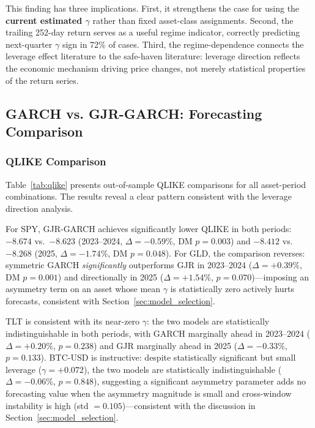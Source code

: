 This finding has three implications. First, it strengthens the case for using the \textbf{current estimated $\gamma$} rather than fixed asset-class assignments. Second, the trailing 252-day return serves as a useful regime indicator, correctly predicting next-quarter $\gamma$ sign in 72\% of cases. Third, the regime-dependence connects the leverage effect literature to the safe-haven literature: leverage direction reflects the economic mechanism driving price changes, not merely statistical properties of the return series.


\subsection{GARCH vs. GJR-GARCH: Forecasting Comparison}
\label{sec:garch_comparison}

\subsubsection{QLIKE Comparison}

Table~\ref{tab:qlike} presents out-of-sample QLIKE comparisons for all asset-period combinations. The results reveal a clear pattern consistent with the leverage direction analysis.

For SPY, GJR-GARCH achieves significantly lower QLIKE in both periods: $-8.674$ vs.\ $-8.623$ (2023--2024, $\Delta = -0.59\%$, DM $p = 0.003$) and $-8.412$ vs.\ $-8.268$ (2025, $\Delta = -1.74\%$, DM $p = 0.048$). For GLD, the comparison reverses: symmetric GARCH \emph{significantly} outperforms GJR in 2023--2024 ($\Delta = +0.39\%$, DM $p = 0.001$) and directionally in 2025 ($\Delta = +1.54\%$, $p = 0.070$)---imposing an asymmetry term on an asset whose mean $\gamma$ is statistically zero actively hurts forecasts, consistent with Section~\ref{sec:model_selection}.

TLT is consistent with its near-zero $\gamma$: the two models are statistically indistinguishable in both periods, with GARCH marginally ahead in 2023--2024 ($\Delta = +0.20\%$, $p = 0.238$) and GJR marginally ahead in 2025 ($\Delta = -0.33\%$, $p = 0.133$).%
 BTC-USD is instructive: despite statistically significant but small leverage ($\gamma = +0.072$), the two models are statistically indistinguishable ($\Delta = -0.06\%$, $p = 0.848$), suggesting a significant asymmetry parameter adds no forecasting value when the asymmetry magnitude is small and cross-window instability is high (std $= 0.105$)---consistent with the discussion in Section~\ref{sec:model_selection}.

